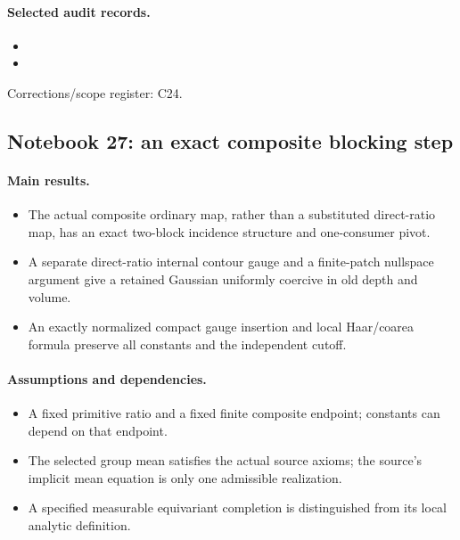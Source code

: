 \paragraph{Selected audit records.}
\begingroup\small
\begin{itemize}
\item {}
\item {}
\end{itemize}
\endgroup
Corrections/scope register: C24.\par

\subsection{Notebook 27: an exact composite blocking step}
\label{hnc-27}
\noindent{}\par

\paragraph{Main results.}
\begin{itemize}
\item The actual composite ordinary map, rather than a substituted direct-ratio map, has an exact two-block incidence structure and one-consumer pivot.
\item A separate direct-ratio internal contour gauge and a finite-patch nullspace argument give a retained Gaussian uniformly coercive in old depth and volume.
\item An exactly normalized compact gauge insertion and local Haar/coarea formula preserve all constants and the independent cutoff.
\end{itemize}

\paragraph{Assumptions and dependencies.}
\begin{itemize}
\item A fixed primitive ratio and a fixed finite composite endpoint; constants can depend on that endpoint.
\item The selected group mean satisfies the actual source axioms; the source's implicit mean equation is only one admissible realization.
\item A specified measurable equivariant completion is distinguished from its local analytic definition.
\end{itemize}


